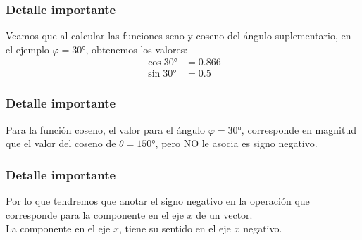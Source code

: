 \documentclass[14pt]{beamer}
\begin{document}
\begin{frame}
\frametitle{Detalle importante}
Veamos que al calcular las funciones seno y coseno del ángulo suplementario, en el ejemplo $\varphi = \ang{30}$, obtenemos los valores:
\pause
\begin{align*}
\cos \ang{30} &= 0.866 \\[0.5em]
\sin \ang{30} &= 0.5
\end{align*}
\end{frame}
\begin{frame}
\frametitle{Detalle importante}
Para la función coseno, el valor para el ángulo $\varphi = \ang{30}$, corresponde en magnitud que el valor del coseno de $\theta = \ang{150}$, pero NO le asocia es signo negativo.
\end{frame}
\begin{frame}
\frametitle{Detalle importante}
Por lo que tendremos que anotar el signo negativo en la operación que corresponde para la componente en el eje $x$ de un vector.
\\
\bigskip
\pause
La componente en el eje $x$, tiene su sentido en el eje $x$ negativo.
\end{frame}
\end{document}
